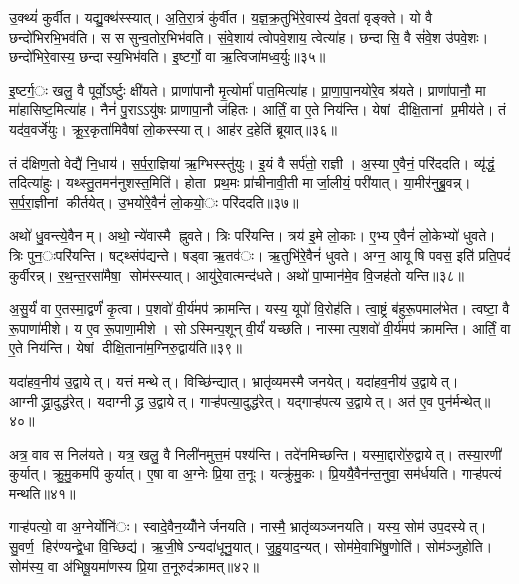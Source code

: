 उ॒क्थ्यं॑ कुर्वीत। यद्यु॒क्थ॑स्स्यात्। अ॒ति॒रा॒त्रं कु॑र्वीत। य॒ज्ञ॒क्र॒तुभि॑रे॒वास्य॑ दे॒वता॑ वृङ्क्ते। यो वै छन्दो॑भिरभि॒भव॑ति। स ससुन्व॒तोर॒भिभ॑वति। सं॒वे॒शाय॑ त्वोपवे॒शाय॒ त्वेत्या॑ह। छन्दासि॒ वै सं॑वे॒श उ॑पवे॒शः। छन्दो॑भिरे॒वास्य॒ छन्दास्य॒भिभ॑वति। इ॒ष्टर्गो॒ वा ऋ॒त्विजा॑मध्व॒र्युः॥३५॥

इ॒ष्टर्ग॒ः खलु॒ वै पूर्वो॒ऽर्ष्टुः क्षी॑यते। प्राणा॑पानौ मृ॒त्योर्मा॑ पात॒मित्या॑ह। प्रा॒णा॒पा॒नयो॑रे॒व श्र॑यते। प्राणा॑पानौ॒ मा मा॑हासिष्ट॒मित्या॑ह। नैनं॑ पु॒राऽऽयु॑षः प्राणापा॒नौ ज॑हितः। आर्तिं॒ वा ए॒ते निय॑न्ति। येषां दीक्षि॒तानां प्र॒मीय॑ते। तं यद॑व॒वर्जे॑युः। क्रू॒र॒कृता॑मिवैषां लो॒कस्स्यात्। आह॑र द॒हेति॑ ब्रूयात्॥३६॥

तं द॑क्षिण॒तो वेद्यै॑ नि॒धाय॑। स॒र्प॒रा॒ज्ञिया॑ ऋ॒ग्भिस्स्तु॑युः। इ॒यं वै सर्प॑तो॒ राज्ञी। अ॒स्या ए॒वैनं॒ परि॑ददति। व्यृ॑द्धं॒ तदित्या॑हुः। यथ्स्तु॒तमन॑नुशस्त॒मिति॑। होता प्रथ॒मः प्रा॑चीनावी॒ती मार्जा॒लीयं॒ परी॑यात्। या॒मीर॑नुब्रु॒वन्न्। स॒र्प॒रा॒ज्ञीनां कीर्तयेत्। उ॒भयो॑रे॒वैनं॑ लो॒कयो॒ः परि॑ददति॥३७॥

अथो॑ धु॒वन्त्ये॒वैनम्। अथो॒ न्ये॑वास्मै ह्नुवते। त्रिः परि॑यन्ति। त्रय॑ इ॒मे लो॒काः। ए॒भ्य ए॒वैनं॑ लो॒केभ्यो॑ धुवते। त्रिः पुन॒ःपरि॑यन्ति। षट्थ्संप॑द्यन्ते। षड्वा ऋ॒तव॑ः। ऋ॒तुभि॑रे॒वैनं॑ धुवते। अग्न॒ आयूषि पवस॒ इति॑ प्रति॒पदं॑ कुर्वीरन्न्। र॒थ॒न्त॒रसा॑मैषा॒ सोम॑स्स्यात्। आयु॑रे॒वात्मन्द॑धते। अथो॑ पा॒प्मान॑मे॒व वि॒जह॑तो यन्ति॥३८॥


अ॒सु॒र्यं॑ वा ए॒तस्मा॒द्वर्णं॑ कृ॒त्वा। प॒शवो॑ वी॒र्य॑मप॑ क्रामन्ति। यस्य॒ यूपो॑ वि॒रोह॑ति। त्वा॒ष्ट्रं ब॑हुरू॒पमाल॑भेत। त्वष्टा॒ वै रू॒पाणा॑मीशे। य ए॒व रू॒पाणा॒मीशे। सोऽस्मिन्प॒शून् वी॒र्यं॑ यच्छति। नास्मात्प॒शवो॑ वी॒र्य॑मप॑ क्रामन्ति। आर्तिं॒ वा ए॒ते निय॑न्ति। येषां दीक्षि॒ताना॑म॒ग्निरु॒द्वाय॑ति॥३९॥

यदा॑हव॒नीय॑ उ॒द्वायेत्। यत्तं मन्थेत्। विच्छि॑न्द्यात्। भ्रातृ॑व्यमस्मै जनयेत्। यदा॑हव॒नीय॑ उ॒द्वायेत्। आग्नीद्ध्रा॒दुद्ध॑रेत्। यदाग्नीद्ध्र उ॒द्वायेत्। गाऱ्ह॑पत्या॒दुद्ध॑रेत्। यद्गाऱ्ह॑पत्य उ॒द्वायेत्। अत॑ ए॒व पुन॑र्मन्थेत्॥४०॥

अत्र॒ वाव स निल॑यते। यत्र॒ खलु॒ वै निली॑नमुत्त॒मं पश्य॑न्ति। तदे॑नमिच्छन्ति। यस्मा॒द्दारो॑रु॒द्वायेत्। तस्या॒रणी॑ कुर्यात्। क्रु॒मु॒कमपि॑ कुर्यात्। ए॒षा वा अ॒ग्नेः प्रि॒या त॒नूः। यत्क्रु॑मु॒कः। प्रि॒ययै॒वैन॑न्त॒नुवा॒ सम॑र्धयति। गाऱ्ह॑पत्यं मन्थति॥४१॥

गाऱ्ह॑पत्यो॒ वा अ॒ग्नेर्योनि॑ः। स्वादे॒वैन॒य्योँनेर्जनयति। नास्मै॒ भ्रातृ॑व्यञ्जनयति। यस्य॒ सोम॑ उप॒दस्येत्। सु॒वर्ण॒ हिर॑ण्यन्द्वे॒धा वि॒च्छिद्य॑। ऋ॒जी॒षेऽन्यदा॑धूनु॒यात्। जु॒हु॒याद॒न्यत्। सोम॑मे॒वाभि॑षु॒णोति॑। सोम॑ञ्जुहोति। सोम॑स्य॒ वा अ॑भिषू॒यमा॑णस्य प्रि॒या त॒नूरुद॑क्रामत्॥४२॥

